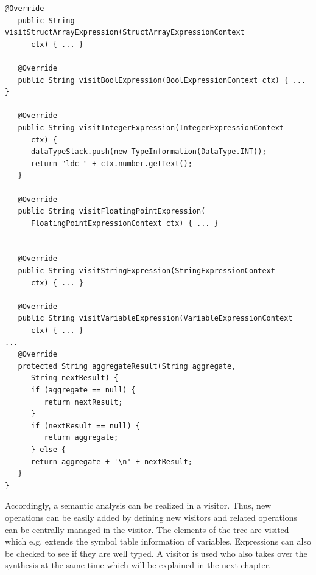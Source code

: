 \begin{lstlisting}[frame=htrbl, caption={Implementation of {\ttfamily EVisitor.java}}, label={lst:visitor}, basicstyle=\footnotesize]
   @Override 
   public String visitStructArrayExpression(StructArrayExpressionContext 
      ctx) { ... }

   @Override
   public String visitBoolExpression(BoolExpressionContext ctx) { ... }

   @Override
   public String visitIntegerExpression(IntegerExpressionContext 
      ctx) { 
      dataTypeStack.push(new TypeInformation(DataType.INT));
      return "ldc " + ctx.number.getText();
   }

   @Override
   public String visitFloatingPointExpression(
      FloatingPointExpressionContext ctx) { ... }


   @Override
   public String visitStringExpression(StringExpressionContext 
      ctx) { ... }

   @Override
   public String visitVariableExpression(VariableExpressionContext 
      ctx) { ... }
...
   @Override
   protected String aggregateResult(String aggregate, 
      String nextResult) {
      if (aggregate == null) {
         return nextResult;
      }
      if (nextResult == null) {
         return aggregate;
      } else {
      return aggregate + '\n' + nextResult;
   }
}
\end{lstlisting}

Accordingly, a semantic analysis can be realized in a visitor. Thus, new operations can be easily added by defining new visitors and related operations can be centrally managed in the visitor. The elements of the tree are visited which e.g. extends the symbol table information of variables. Expressions can also be checked to see if they are well typed. A visitor is used who also takes over the synthesis at the same time which will be explained in the next chapter.

